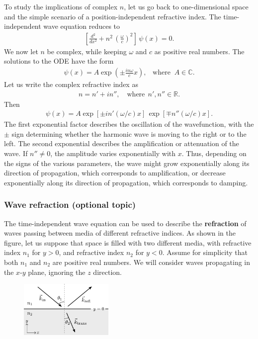 \documentclass[10pt,a4paper]{article}
\begin{document}
To study the implications of complex $n$, let us go back to
one-dimensional space and the simple scenario of a
position-independent refractive index. The time-independent wave
equation reduces to
\begin{align}
  \left[\frac{d^2}{d x^2} + n^2\, \left(\frac{\omega}{c}\right)^2\right] \, \psi(x) = 0.
\end{align}
We now let $n$ be complex, while keeping $\omega$ and $c$ as positive
real numbers. The solutions to the ODE have the form
\begin{align}
  \psi(x) = A \exp\left(\pm \frac{in\omega}{c}x\right),\;\;\;\mathrm{where}\;\; A \in \mathbb{C}.
  \label{eq:gainloss-wave}
\end{align}
Let us write the complex refractive index as
\begin{align}
  n = n' + i n'',\quad \textrm{where}\;\, n',n'' \in \mathbb{R}.
\end{align}
Then
\begin{align}
  \psi(x) = A \exp\left[\pm in'(\omega/c)x\right]\, \exp\left[\mp n''(\omega/c)x\right].
\end{align}
The first exponential factor describes the oscillation of the
wavefunction, with the $\pm$ sign determining whether the harmonic
wave is moving to the right or to the left. The second exponential
describes the amplification or attenuation of the wave.  If $n'' \ne
0$, the amplitude varies exponentially with $x$. Thus, depending on
the signs of the various parameters, the wave might grow exponentially
along its direction of propagation, which corresponds to
amplification, or decrease exponentially along its direction of
propagation, which corresponds to damping.

\subsubsection{Wave refraction (optional topic)}

The time-independent wave equation can be used to describe the
\textbf{refraction} of waves passing between media of different
refractive indices.  As shown in the figure, let us suppose that space
is filled with two different media, with refractive index $n_1$ for $y
> 0$, and refractive index $n_2$ for $y < 0$.  Assume for simplicity
that both $n_1$ and $n_2$ are positive real numbers.  We will consider
waves propagating in the $x$-$y$ plane, ignoring the $z$ direction.

\begin{figure}[h]
  \centering\includegraphics[width=0.4\textwidth]{refraction}
\end{figure}
\end{document}
